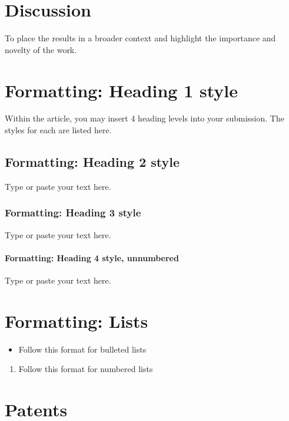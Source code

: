 \documentclass[12pt]{Definitions/academia}
\begin{document}
\section{Discussion}
To place the results in a broader context and highlight the importance and novelty of the work.


\section{Formatting: Heading 1 style}

Within the article, you may insert 4 heading levels into your submission. The styles for each are listed here.

\subsection{Formatting: Heading 2 style}

Type or paste your text here.

\subsubsection{Formatting: Heading 3 style}

Type or paste your text here.

\paragraph{Formatting: Heading 4 style, unnumbered}

Type or paste your text here.

\section*{Formatting: Lists}
\begin{itemize}
  \item	Follow this format for bulleted lists
\end{itemize}

\begin{enumerate}
  \item Follow this format for numbered lists
\end{enumerate}

\section*{Patents}
\end{document}
